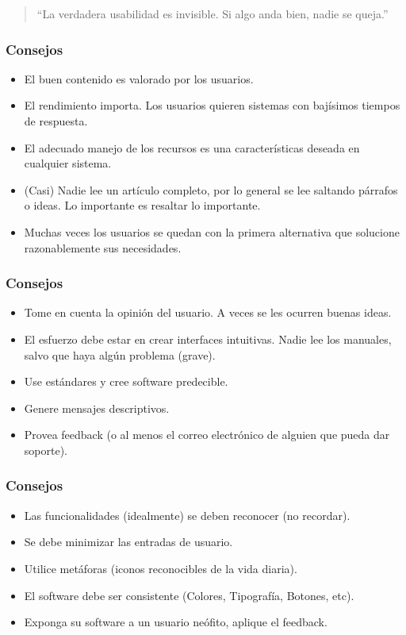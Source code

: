 \documentclass[12pt]{beamer}
\begin{document}
\begin{frame}
 \begin{quote}
	``La verdadera usabilidad es invisible. Si algo anda bien, nadie se queja.''
 \newline
 \end{quote}
\end{frame}


\begin{frame}
 \frametitle{Consejos}
 \begin{itemize}
  \item<1-> El buen contenido es valorado por los usuarios.
  \item<2-> El rendimiento \alert{importa}. Los usuarios quieren sistemas con bajísimos tiempos de respuesta.
  \item<3-> El adecuado manejo de los recursos es una características deseada en cualquier sistema.
  \item<4-> (Casi) Nadie lee un artículo completo, por lo general se lee saltando párrafos o ideas. Lo importante es resaltar lo importante.
  \item<5-> Muchas veces los usuarios se quedan con la primera alternativa que solucione razonablemente sus necesidades.
 \end{itemize}
\end{frame}


\begin{frame}
 \frametitle{Consejos}
 \begin{itemize}
  \item<1-> Tome en cuenta la opinión del usuario. A veces se les ocurren buenas ideas.
  \item<2-> El esfuerzo debe estar en crear interfaces intuitivas. Nadie lee los manuales, salvo que haya algún problema (grave).
  \item<3-> Use estándares y cree software \alert{predecible}.
  \item<4-> Genere mensajes descriptivos.
  \item<5-> Provea feedback (o al menos el correo electrónico de alguien que pueda dar soporte).
 \end{itemize}
\end{frame}


\begin{frame}
 \frametitle{Consejos}
 \begin{itemize}
  \item<1-> Las funcionalidades (idealmente) se deben reconocer (no recordar).
  \item<2-> Se debe minimizar las entradas de usuario.
  \item<3-> Utilice metáforas (iconos reconocibles de la vida diaria).
  \item<4-> El software debe ser consistente (Colores, Tipografía, Botones, etc).
  \item<5-> Exponga su software a un usuario neófito, aplique el feedback.
 \end{itemize}
\end{frame}
\end{document}
